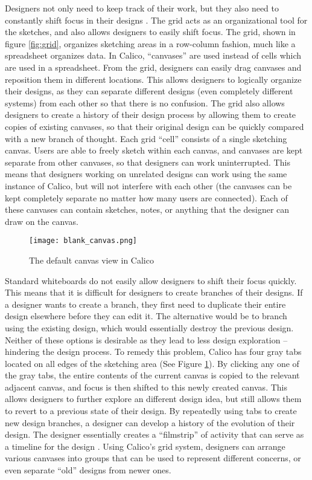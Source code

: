 Designers not only need to keep track of their work, but they also need to constantly shift focus in their designs \cite{petre, zannier}.
The grid acts as an organizational tool for the sketches, and also allows designers to easily shift focus.
The grid, shown in figure \ref{fig:grid}, organizes sketching areas in a row-column fashion, much like a spreadsheet organizes data. 
In Calico, ``canvases'' are used instead of cells which are used in a spreadsheet.
From the grid, designers can easily drag canvases and reposition them in different locations. This allows designers to logically organize their designs, as they can separate different designs (even completely different systems) from each other so that there is no confusion. 
The grid also allows designers to create a history of their design process by allowing them to create copies of existing canvases, so that their original design can be quickly compared with a new branch of thought. Each grid ``cell'' consists of a single sketching canvas. 
Users are able to freely sketch within each canvas, and canvases are kept separate from other canvases, so that designers can work uninterrupted. This means that designers working on unrelated designs can work using the same instance of Calico, but will not interfere with each other (the canvases can be kept completely separate no matter how many users are connected).
Each of these canvases can contain sketches, notes, or anything that the designer can draw on the canvas. 


\begin{figure}[h]
  \centering
  \texttt{[image: blank\_canvas.png]}
  \caption{The default canvas view in Calico}
  \label{fig:canvas}
\end{figure}
Standard whiteboards do not easily allow designers to shift their focus quickly. This means that it is difficult for designers to create branches of their designs. If a designer wants to create a branch, they first need to duplicate their entire design elsewhere before they can edit it. The alternative would be to branch using the existing design, which would essentially destroy the previous design. Neither of these options is desirable as they lead to less design exploration -- hindering the design process. To remedy this problem, Calico has four gray tabs located on all edges of the sketching area (See Figure \ref{fig:canvas}). By clicking any one of the gray tabs, the entire contents of the current canvas is copied to the relevant adjacent canvas, and focus is then shifted to this newly created canvas. This allows designers to further explore an different design idea, but still allows them to revert to a previous state of their design. By repeatedly using tabs to create new design branches, a designer can develop a history of the evolution of their design. The designer essentially creates a ``filmstrip'' of activity that can serve as a timeline for the design \cite{filmstrip}. Using Calico's grid system, designers can arrange various canvases into groups that can be used to represent different concerns, or even separate ``old'' designs from newer ones.



